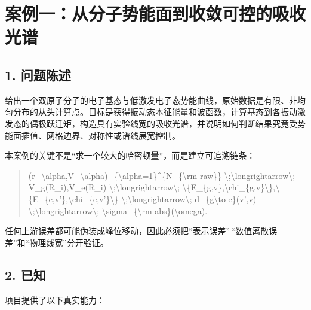 \documentclass[UTF8,openany,11pt,fontset=fandol]{ctexbook}
\begin{document}
\section{\texorpdfstring{\textbf{案例一：从分子势能面到收敛可控的吸收光谱}}{案例一：从分子势能面到收敛可控的吸收光谱}}\label{ux6848ux4f8bux4e00ux4eceux5206ux5b50ux52bfux80fdux9762ux5230ux6536ux655bux53efux63a7ux7684ux5438ux6536ux5149ux8c31}

\subsection{\texorpdfstring{\textbf{1.
问题陈述}}{1. 问题陈述}}\label{ux95eeux9898ux9648ux8ff0}

给出一个双原子分子的电子基态与低激发电子态势能曲线，原始数据是有限、非均匀分布的从头计算点。目标是获得振动态本征能量和波函数，计算基态到各振动激发态的偶极跃迁矩，构造具有实验线宽的吸收光谱，并说明如何判断结果究竟受势能面插值、网格边界、对称性或谱线展宽控制。

本案例的关键不是``求一个较大的哈密顿量''，而是建立可追溯链条：

\begin{quote}
(r\_\textbackslash alpha,V\_\textbackslash alpha)\_\{\textbackslash alpha=1\}\^{}\{N\_\{\textbackslash rm
raw\}\} \textbackslash;\textbackslash longrightarrow\textbackslash;
V\_g(R\_i),V\_e(R\_i)
\textbackslash;\textbackslash longrightarrow\textbackslash;
\textbackslash\{E\_\{g,v\},\textbackslash chi\_\{g,v\}\textbackslash\},\textbackslash\{E\_\{e,v'\},\textbackslash chi\_\{e,v'\}\textbackslash\}
\textbackslash;\textbackslash longrightarrow\textbackslash;
d\_\{g\textbackslash to e\}(v',v)
\textbackslash;\textbackslash longrightarrow\textbackslash;
\textbackslash sigma\_\{\textbackslash rm abs\}(\textbackslash omega).
\end{quote}

任何上游误差都可能伪装成峰位移动，因此必须把``表示误差''\,``数值离散误差''和``物理线宽''分开验证。

\subsection{\texorpdfstring{\textbf{2.
已知}}{2. 已知}}\label{ux5df2ux77e5}

项目提供了以下真实能力：
\end{document}
